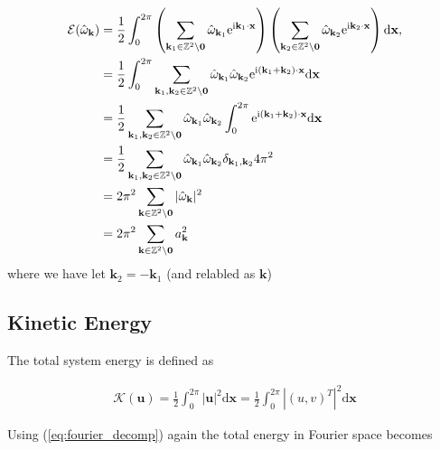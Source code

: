 \documentclass[9pt]{article}
\newcommand{\ii}{\mathrm{i}}      								  %
\newcommand{\e}{\mathrm{e}}      								  %
\newcommand{\bfu}{\mathbf{u}}											%
\newcommand{\omegahat}[1]{\hat{\omega}_{ \mathbf{#1} } }								%
\newcommand{\bfx}{\mathbf{x}}								%
\newcommand{\bfk}{\mathbf{k}}								%
\newcommand{\bfkn}[1]{\mathbf{k}_{#1}}								%
\begin{document}
\begin{align}
	\mathcal{E}(\omegahat{k}) &= \frac{1}{2}\int_{0}^{2\pi} \left(\sum_{\mathbf{k}_1\in \mathbb{Z}^2\setminus \mathbf{0}}\hat{\omega}_{\mathbf{k}_1}\e^{\ii \mathbf{k}_1\cdot \mathbf{x}}\right)\left(\sum_{\mathbf{k}_2\in \mathbb{Z}^2\setminus \mathbf{0}}\hat{\omega}_{\mathbf{k}_2}\e^{\ii \mathbf{k}_2\cdot \mathbf{x}}\right)  \mathrm{d}\bfx, \notag \\
	&= \frac{1}{2}\int_{0}^{2\pi}\sum_{\mathbf{k}_1, \bfkn{2}\in \mathbb{Z}^2\setminus \mathbf{0}}\hat{\omega}_{\mathbf{k}_1}\hat{\omega}_{\mathbf{k}_2} \e^{\ii \left(\mathbf{k}_1 + \bfkn{2}\right)\cdot \mathbf{x}}\mathrm{d}\bfx \notag \\
	&=\frac{1}{2}\sum_{\mathbf{k}_1, \bfkn{2}\in \mathbb{Z}^2\setminus \mathbf{0}}\hat{\omega}_{\mathbf{k}_1}\hat{\omega}_{\mathbf{k}_2} \int_{0}^{2\pi} \e^{\ii \left(\mathbf{k}_1 + \bfkn{2}\right)\cdot \mathbf{x}}\mathrm{d}\bfx \notag \\
	&= \frac{1}{2}\sum_{\mathbf{k}_1, \bfkn{2}\in \mathbb{Z}^2\setminus \mathbf{0}}\hat{\omega}_{\mathbf{k}_1}\hat{\omega}_{\mathbf{k}_2} \delta_{\bfkn{1}, \bfkn{2}} 4 \pi^2 \notag \\
	&= 2 \pi^2 \sum_{\mathbf{k}\in \mathbb{Z}^2\setminus \mathbf{0}}|\hat{\omega}_{\mathbf{k}} |^2 \notag \\
	&= 2 \pi^2 \sum_{\mathbf{k}\in \mathbb{Z}^2\setminus \mathbf{0}} a_{\bfk}^2
	\label{eq:enstrophy_fourier}
\end{align}
where we have let $\bfkn{2} = - \bfkn{1}$ (and relabled as $\bfk$)


\subsection{Kinetic Energy}

The total system energy is defined as

\begin{align}
	\mathcal{K}(\bfu) = \frac{1}{2}\int_0^{2 \pi}|\bfu|^2\mathrm{d}\bfx = \frac{1}{2}\int_0^{2\pi} |(u, v)^{T}|^2 \mathrm{d}\bfx 
\end{align}

Using (\ref{eq:fourier_decomp}) again the total energy in Fourier space becomes
\end{document}
